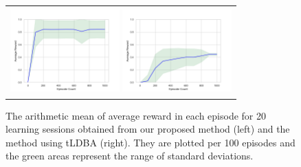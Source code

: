 \documentclass[letterpaper, 10 pt, conference]{ieeeconf}  %
\begin{document}
\begin{figure}[tbp]
 \centering
 \begin{tabular}{c}
  \begin{minipage}{0.5\hsize}
     \centering
     \includegraphics[bb=0 0 461 346, height = 3.3cm, width=4.2cm]{ep_1000_it_10000_MDP3_gamma_095_re2_ini22_nts_c095_20times_no2.png}
 \end{minipage}

 \begin{minipage}{0.5\hsize}
   \centering
   \includegraphics[bb=0 0 461 346, height = 3.3cm, width=4.2cm]{ep_1000_it_10000_MDP3_gamma_095_nts_c095_ldba_20times.png}
 \end{minipage}
\end{tabular}
 \caption{The arithmetic mean of average reward in each episode for 20 learning sessions obtained from our proposed method (left) and the method using tLDBA (right). They are plotted per 100 episodes and the green areas represent the range of standard deviations. }
 \label{result}
\end{figure}
\end{document}
